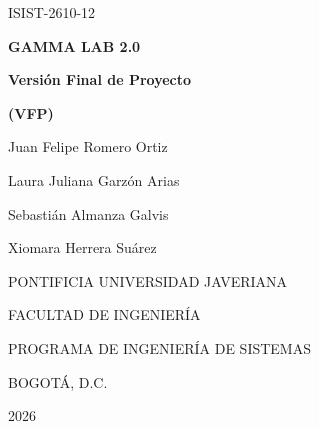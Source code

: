 \documentclass[12pt,letterpaper]{article}
\begin{document}
\providecommand{\tituloProyecto}{GAMMA LAB 2.0}
\providecommand{\grupo}{ISIST-2610-12}
\providecommand{\autorUno}{Juan Felipe Romero Ortiz}
\providecommand{\autorDos}{Laura Juliana Garzón Arias}
\providecommand{\autorTres}{Sebastián Almanza Galvis}
\providecommand{\autorCuatro}{Xiomara Herrera Suárez}
\providecommand{\leyendaGrado}{MEMORIA DE PROYECTO DE GRADO REALIZADO PARA CUMPLIR UNO DE
LOS REQUISITOS PARA EL TÍTULO EN INGENIERÍA DE SISTEMAS}
\providecommand{\director}{Ing. Cécile Gauthier Umaña}
\providecommand{\juradoUno}{Ing. Leonardo Flórez}
\providecommand{\juradoDos}{Ing. Alexander Caicedo}
\providecommand{\universidad}{PONTIFICIA UNIVERSIDAD JAVERIANA}
\providecommand{\universidadNombre}{Pontificia Universidad Javeriana}
\providecommand{\facultad}{FACULTAD DE INGENIERÍA}
\providecommand{\programa}{PROGRAMA DE INGENIERÍA DE SISTEMAS}
\providecommand{\ciudad}{BOGOTÁ, D.C.}
\providecommand{\anio}{2026}
\providecommand{\fechaLarga}{Noviembre, 2026}
\providecommand{\rector}{P. Luis Fernando Múnera Congote, S.J.}
\providecommand{\decano}{Ing. Diego Alejandro Patiño Guevara, Ph.D.}
\providecommand{\directorDepto}{Ing. César Julio Bustacara Medina, Ph.D.}
\providecommand{\directorCarrera}{Ing. Andrea del Pilar Rueda Olarte}

\begingroup\setlength{\parskip}{0pt}%

\thispagestyle{empty}
\begin{center}
  \vspace*{1cm}
  {\large \grupo}\par\vspace{1.2cm}
  {\LARGE\bfseries \tituloProyecto}\par\vspace{1cm}
  {\Large\bfseries Versión Final de Proyecto}\par\vspace{0.3cm}
  {\large\bfseries (VFP)}\par\vspace{2cm}
  \autorUno\par
  \autorDos\par
  \autorTres\par
  \autorCuatro\par
  \vfill
  \universidad\par
  \facultad\par
  \programa\par
  \ciudad\par
  \anio\par
  \vspace{1cm}
\end{center}
\clearpage
\end{document}
